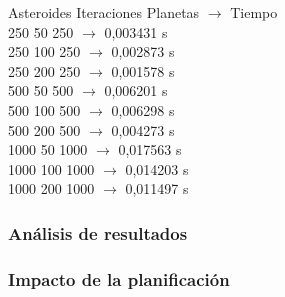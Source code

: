 \documentclass[12pt]{article}
\begin{document}
\begin{enumerate}[label=(\Alph*)]
                \begin{center}
                    \noindent Asteroides Iteraciones Planetas $\rightarrow$ Tiempo \\
                    250 50 250 $\rightarrow$ 0,003431 s \\
                    250 100 250 $\rightarrow$ 0,002873 s \\
                    250 200 250 $\rightarrow$ 0,001578 s \\
                    500 50 500 $\rightarrow$ 0,006201 s \\
                    500 100 500 $\rightarrow$ 0,006298 s \\
                    500 200 500 $\rightarrow$ 0,004273 s \\
                    1000 50 1000 $\rightarrow$ 0,017563 s \\
                    1000 100 1000 $\rightarrow$ 0,014203 s \\
                    1000 200 1000 $\rightarrow$ 0,011497 s \\
                \end{center}
            \end{enumerate}
        \newpage
        \subsubsection{Análisis de resultados}
        \subsubsection{Impacto de la planificación}





\end{document}
